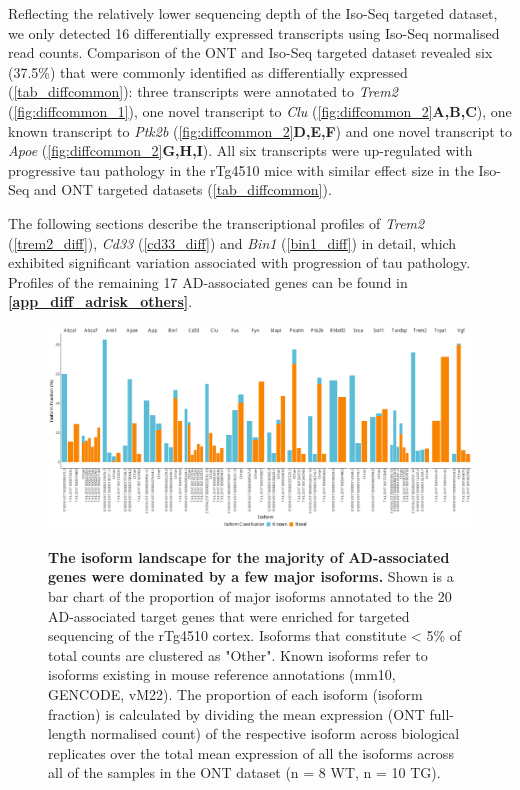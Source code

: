 Reflecting the relatively lower sequencing depth of the Iso-Seq targeted dataset, we only detected 16 differentially expressed transcripts using Iso-Seq normalised read counts. Comparison of the ONT and Iso-Seq targeted dataset revealed six (37.5\%) that were commonly identified as differentially expressed (\cref{tab_diffcommon}): three transcripts were annotated to \textit{Trem2} (\cref{fig:diffcommon_1}), one novel transcript to \textit{Clu} (\cref{fig:diffcommon_2}\textbf{A,B,C}), one known transcript to \textit{Ptk2b} (\cref{fig:diffcommon_2}\textbf{D,E,F}) and one novel transcript to \textit{Apoe} (\cref{fig:diffcommon_2}\textbf{G,H,I}). All six transcripts were up-regulated with progressive tau pathology in the rTg4510 mice with similar effect size in the Iso-Seq and ONT targeted datasets (\cref{tab_diffcommon}).  

The following sections describe the transcriptional profiles of \textit{Trem2} (\cref{trem2_diff}), \textit{Cd33} (\cref{cd33_diff}) and \textit{Bin1} (\cref{bin1_diff}) in detail, which exhibited significant variation associated with progression of tau pathology. Profiles of the remaining 17 AD-associated genes can be found in \textbf{\cref{app_diff_adrisk_others}}.


\begin{landscape}
	\begin{figure}[htp]
		\centering
		\includegraphics[page=1,trim={0 0 0 0},scale =0.4]{Figures/GlobalIF.pdf}
		\captionsetup{width=1.5\textwidth}
		\label{fig:globalIF}
		\caption[Identification of major isoforms annotated to AD-associated target genes]%
		{\textbf{The isoform landscape for the majority of AD-associated genes were dominated by a few major isoforms.} Shown is a bar chart of the proportion of major isoforms annotated to the 20 AD-associated target genes that were enriched for targeted sequencing of the rTg4510 cortex. Isoforms that constitute < 5\% of total counts are clustered as "Other". Known isoforms refer to isoforms existing in mouse reference annotations (mm10, GENCODE, vM22). The proportion of each isoform (isoform fraction) is calculated by dividing the mean expression (ONT full-length normalised count) of the respective isoform across biological replicates over the total mean expression of all the isoforms across all of the samples in the ONT dataset (n = 8 WT, n = 10 TG). }   
	\end{figure}
\end{landscape}

